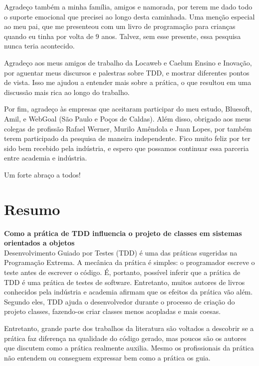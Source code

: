 \documentclass[11pt,openany,twoside,a4paper]{book}
\begin{document}
Agradeço também a minha família, amigos e namorada, por terem me dado todo o suporte
emocional que precisei ao longo desta caminhada. Uma menção especial ao meu pai,
que me presenteou com um livro de programação para crianças quando eu tinha por volta
de 9 anos. Talvez, sem esse presente, essa pesquisa nunca teria acontecido.

Agradeço aos meus amigos de trabalho da Locaweb e Caelum Ensino e Inovação, 
por aguentar meus discursos e palestras sobre TDD, e mostrar diferentes
pontos de vista. Isso me ajudou a entender mais sobre a prática, o que resultou
em uma discussão mais rica ao longo do trabalho.

Por fim, agradeço às empresas que aceitaram participar do meu estudo, Bluesoft,
Amil, e WebGoal (São Paulo e Poços de Caldas). Além disso, obrigado aos meus colegas
de profissão Rafael Werner, Murilo Amêndola e Juan Lopes, por também terem
participado da pesquisa de maneira independente. Fico muito feliz por ter sido
bem recebido pela indústria, e espero que possamos continuar essa parceria entre
academia e indústria.

Um forte abraço a todos!

\chapter*{Resumo}

\textbf{Como a prática de TDD influencia o projeto de classes em sistemas orientados a objetos}
\\

Desenvolvimento Guiado por Testes (TDD) é uma das práticas sugeridas na Programação
Extrema. A mecânica da prática é simples: o programador escreve o teste antes
de escrever o código. É, portanto, possível inferir que a prática de TDD é uma
prática de testes de software. Entretanto, muitos autores de livros 
conhecidos pela indústria e academia
afirmam que os efeitos da prática vão além. Segundo eles,
TDD ajuda o desenvolvedor durante o processo de criação do projeto classes,
fazendo-os criar classes menos acopladas e mais coesas.

Entretanto, grande parte dos trabalhos da literatura são voltados a descobrir se
a prática faz diferença na qualidade do código gerado, mas poucos são os 
autores que discutem como a prática realmente auxilia.
Mesmo os profissionais da prática não entendem ou conseguem expressar bem como a prática
os guia.
\end{document}
